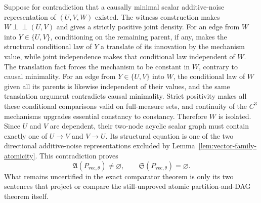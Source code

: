 Suppose for contradiction that a causally minimal scalar additive-noise
representation of \((U,V,W)\) existed.  The witness construction makes
\(W\perp\!\!\!\perp(U,V)\) and gives a strictly positive joint density.  For
an edge from \(W\) into \(Y\in\{U,V\}\), conditioning on the remaining parent,
if any, makes the structural conditional law of \(Y\) a translate of its
innovation by the mechanism value, while joint independence makes that
conditional law independent of \(W\).  The translation fact forces the
mechanism to be constant in \(W\), contrary to causal minimality.  For an edge
from \(Y\in\{U,V\}\) into \(W\), the conditional law of \(W\) given all its
parents is likewise independent of their values, and the same translation
argument contradicts causal minimality.  Strict positivity makes all these
conditional comparisons valid on full-measure sets, and continuity of the
\(C^3\) mechanisms upgrades essential constancy to constancy.  Therefore
\(W\) is isolated.  Since \(U\) and \(V\) are dependent, their two-node
acyclic scalar graph must contain exactly one of \(U\to V\) and \(V\to U\).
Its structural equation is one of the two directional additive-noise
representations excluded by Lemma~\ref{lem:vector-family-atomicity}.  This
contradiction proves
\[
 \mathfrak A(P_{\mathrm{vec},\theta})\ne\varnothing,
 \qquad
 \mathfrak S(P_{\mathrm{vec},\theta})=\varnothing.
\]
What remains uncertified in the exact comparator theorem is only its two
sentences that project or compare the still-unproved atomic
partition-and-DAG theorem itself.